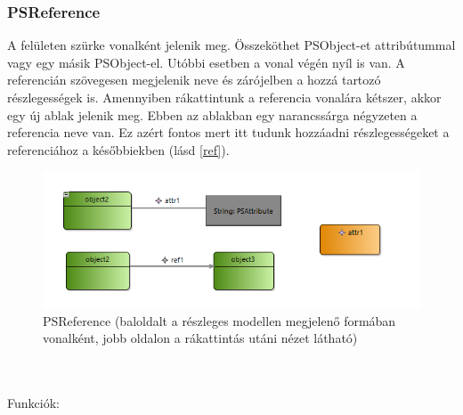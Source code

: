 \subsubsection{PSReference}
A felületen szürke vonalként jelenik meg. Összeköthet PSObject-et attribútummal vagy egy másik PSObject-el. Utóbbi esetben a vonal végén nyíl is van. A referencián szövegesen megjelenik neve és zárójelben a hozzá tartozó részlegességek is. Amennyiben rákattintunk a referencia vonalára kétszer, akkor egy új ablak jelenik meg. Ebben az ablakban egy narancssárga négyzeten a referencia neve van. Ez azért fontos mert itt tudunk hozzáadni részlegességeket a referenciához a későbbiekben (lásd \autoref{ref}).
\begin{figure}[!ht]
	\centering
	\includegraphics{figures/ref.PNG}
	\caption{PSReference (baloldalt a részleges modellen megjelenő formában vonalként, jobb oldalon a rákattintás utáni nézet látható)}
	\label{ref} 
\end{figure}
\\\\
Funkciók:
